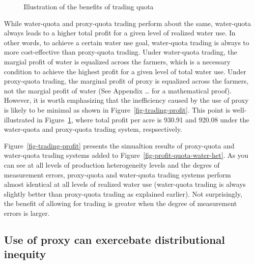 \documentclass[
  letterpaper,
  DIV=11,
  numbers=noendperiod]{scrartcl}
\begin{document}
\begin{figure}[H]


\caption{\label{fig-trading-profit-illustration}Illustration of the
benefits of trading quota}

\end{figure}%

While water-quota and proxy-quota trading perform about the same,
water-quota always leads to a higher total profit for a given level of
realized water use. In other words, to achieve a certain water use goal,
water-quota trading is always to more cost-effective than proxy-quota
trading. Under water-quota trading, the margial profit of water is
equalized across the farmers, which is a necessary condition to achieve
the highest profit for a given level of total water use. Under
proxy-quota trading, the marginal profit of proxy is equalized across
the farmers, not the margial profit of water (See Appendix \ldots{} for
a mathematical proof). However, it is worth emphasizing that the
inefficiency caused by the use of proxy is likely to be minimal as shown
in Figure~\ref{fig-trading-profit}. This point is well-illustrated in
Figure~\ref{fig-trading-profit-illustration}, where total profit per
acre is 930.91 and 920.08 under the water-quota and proxy-quota trading
system, respsectively.

Figure~\ref{fig-trading-profit} presents the simualtion results of
proxy-quota and water-quota trading systems added to
Figure~\ref{fig-profit-quota-water-het}. As you can see at all levels of
production heterogeneity levels and the degres of measurement errors,
proxy-quota and water-quota trading systems perform almost identical at
all levels of realized water use (water-quota trading is always slightly
better than proxy-quota trading as explained earlier). Not surprisingly,
the benefit of allowing for trading is greater when the degree of
measurement errors is larger.

\subsection{Use of proxy can exercebate distributional
inequity}\label{use-of-proxy-can-exercebate-distributional-inequity}
\end{document}
